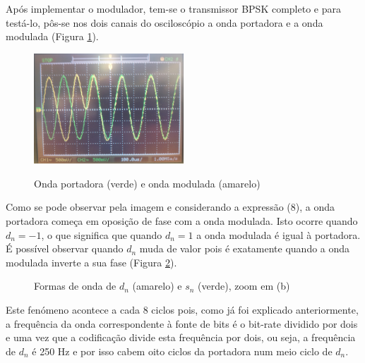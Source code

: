 \documentclass[11pt]{article}
\numberwithin{equation}{section}
\begin{document}
	Após implementar o modulador, tem-se o transmissor BPSK completo e para testá-lo, pôs-se nos dois canais do osciloscópio a onda portadora e a onda modulada (Figura \ref{port_mod}).
	\begin{figure}[H]
		\centering
		\includegraphics[width=0.5\textwidth]{./port_mod}~\\
		\caption{Onda portadora (verde) e onda modulada (amarelo)}
		\label{port_mod}
	\end{figure}
	\vspace{2 mm}
	
	Como se pode observar pela imagem e considerando a expressão (8), a onda portadora começa em oposição de fase com a onda modulada. Isto ocorre quando $d_n=-1$, o que significa que quando $d_n=1$ a onda modulada é igual à portadora. É possível observar quando $d_n$ muda de valor pois é exatamente quando a onda modulada inverte a sua fase (Figura \ref{dn_mod}). 
	\begin{figure}[h]
		\centering
		\hspace{6 mm}
		\caption{Formas de onda de $d_n$ (amarelo) e $s_n$ (verde), zoom em (b)}
		\label{dn_mod}
	\end{figure}
	
	Este fenómeno acontece a cada 8 ciclos pois, como já foi explicado anteriormente, a frequência da onda correspondente à fonte de bits é o bit-rate dividido por dois e uma vez que a codificação divide esta frequência por dois, ou seja, a frequência de $d_n$ é 250 Hz e por isso cabem oito ciclos da portadora num meio ciclo de $d_n$.
	\vspace{2 mm}
	
\end{document}
